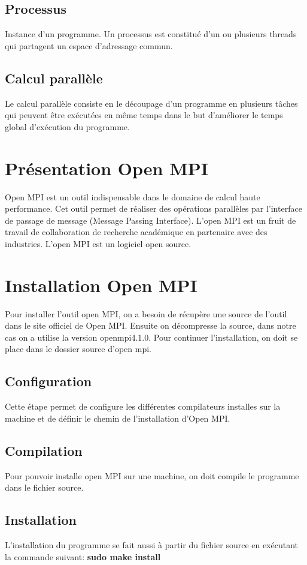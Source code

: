 \documentclass[a4paper,11pt]{report}
\begin{document}
\subsection{Processus}
\qquad Instance d'un programme. Un processus est constitué d'un ou plusieurs threads qui partagent un espace d'adressage commun.

\subsection{Calcul parallèle}
Le calcul parallèle consiste en le découpage d'un programme en plusieurs tâches qui peuvent être exécutées en même temps dans le but d'améliorer le temps global d'exécution du programme.
\section{Présentation Open MPI}
\qquad Open MPI est un outil indispensable dans le domaine de calcul haute performance. Cet outil permet de réaliser des opérations parallèles par l'interface de passage de message (Message Passing Interface). L'open MPI est un fruit de travail de collaboration de recherche académique en partenaire avec des industries. L'open MPI est un logiciel open source.

\section{Installation Open MPI}
\qquad Pour installer l'outil open MPI, on a besoin de récupère une source de l'outil dans le site officiel de Open MPI. Ensuite on décompresse la source, dans notre cas on a utilise la version openmpi4.1.0. Pour continuer l'installation, on doit se place dans le dossier source d'open mpi.
\subsection{Configuration}
\qquad Cette étape permet de configure les différentes compilateurs installes sur la machine et de définir le chemin de l'installation d'Open MPI.
\subsection{Compilation}
\qquad Pour pouvoir installe open MPI sur une machine, on doit compile le programme dans le fichier source. 
\subsection{Installation}
\qquad L'installation du programme se fait aussi à partir du fichier source en exécutant la commande suivant:
\textbf{sudo make install}
\end{document}
